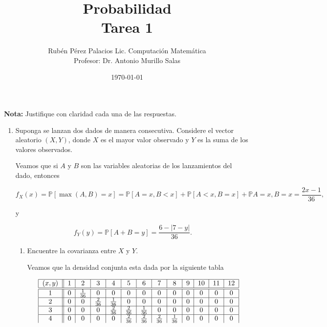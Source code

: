 \documentclass[letterpaper]{article}
\title{Probabilidad \\ Tarea 1}
\author{Rubén Pérez Palacios Lic. Computación Matemática\\Profesor: Dr. Antonio Murillo Salas}
\date{\today}
\theoremstyle{definition}
\theoremstyle{lemathm}
\theoremstyle{lemathm}
\theoremstyle{lemathm}
\theoremstyle{lemademthm}
\newcommand{\abs}[1]{\left| #1 \right| }
\newcommand{\pars}[1]{\left( #1 \right) }
\newcommand{\bracs}[1]{\left[ #1 \right] }
\newcommand{\PP}{\mathbb{P}}
\newcommand{\1}{\mathbbm{1}}
\begin{document}
	\maketitle

	\textbf{Nota:} Justifique con claridad cada una de las respuestas.

	\begin{enumerate}
		\item Suponga se lanzan dos dados de manera consecutiva. Considere el vector aleatorio $\pars{X,Y}$, donde $X$ es el mayor valor observado y $Y$ es la suma de los valores observados.
		
		Veamos que si $A$ y $B$ son las variables aleatorias de los lanzamientos del dado, entonces

		\[f_{X}\pars{x} = \PP\bracs{\max\pars{A,B} = x} = \PP\bracs{A = x, B < x} + \PP\bracs{A < x, B = x} + \PP{A = x, B = x} = \frac{2x-1}{36},\]

		y

		\[f_{Y}(y) = \PP\bracs{A+B = y} = \frac{6-\abs{7-y}}{36}.\]
		
		\begin{enumerate}
			\item Encuentre la covarianza entre $X$ y $Y$.
			
			Veamos que la densidad conjunta esta dada por la siguiente tabla
			
			\[\begin{tabular}{|c||c|c|c|c|c|c|c|c|c|c|c|c|}
				\hline

				$\pars{x,y}$ & 1 & 2 & 3 & 4 & 5 & 6 & 7 & 8 & 9 & 10 & 11 & 12\\

				\hline
				\hline

				1 & 0 & $\frac{1}{36}$ & 0 & 0 & 0 & 0 & 0 & 0 & 0 & 0 & 0 & 0\\

				\hline

				2 & 0 & 0 & $\frac{2}{36}$ & $\frac{1}{36}$ & 0 & 0 & 0 & 0 & 0 & 0 & 0 & 0\\

				\hline

				3 & 0 & 0 & 0 & $\frac{2}{36}$ & $\frac{2}{36}$ & $\frac{1}{36}$ & 0 & 0 & 0 & 0 & 0 & 0\\

				\hline

				4 & 0 & 0 & 0 & 0 & $\frac{2}{36}$ & $\frac{2}{36}$ & $\frac{2}{36}$ & $\frac{1}{36}$ & 0 & 0 & 0 & 0\\


\end{tabular}\]
\end{enumerate}
\end{enumerate}
\end{document}
